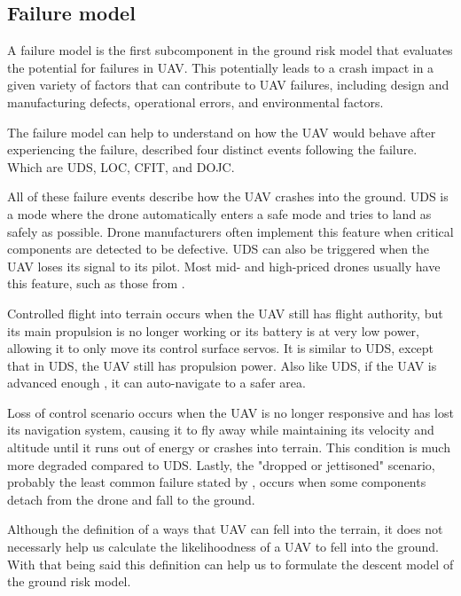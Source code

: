 \documentclass[12pt]{report}
\begin{document}
        \subsection{Failure model}
            A failure model is the first subcomponent in the ground risk model that evaluates the potential for failures
            in UAV. This potentially leads to a crash impact in a given variety of factors that can contribute to UAV
            failures, including design and manufacturing defects, operational errors, and environmental factors.

                The failure model can help to understand on how the UAV would behave after experiencing the failure,
            \cite{washington_review_2017} described four distinct events following the failure. Which are \ac{UDS}, 
            \ac{LOC}, \ac{CFIT}, and \ac{DOJC}.

            All of these failure events describe how the UAV crashes into the ground. UDS is a mode where the drone
            automatically enters a safe mode and tries to land as safely as possible. Drone manufacturers often
            implement this feature when critical components are detected to be defective. UDS can also be triggered when
            the UAV loses its signal to its pilot. Most mid- and high-priced drones usually have this feature, such as
            those from \cite{dji_consumer_2024}.
                
            Controlled flight into terrain occurs when the UAV still has flight authority, but its main propulsion is no
            longer working or its battery is at very low power, allowing it to only move its control surface servos. It
            is similar to UDS, except that in UDS, the UAV still has propulsion power. Also like UDS, if the UAV is
            advanced enough \cite{nemire_dji_2015}, it can auto-navigate to a safer area.
                
            Loss of control scenario occurs when the UAV is no longer responsive and has lost its navigation system,
            causing it to fly away while maintaining its velocity and altitude until it runs out of energy or crashes
            into terrain. This condition is much more degraded compared to UDS. Lastly, the "dropped or jettisoned"
            scenario, probably the least common failure stated by \cite{washington_review_2017}, occurs when some
            components detach from the drone and fall to the ground.

            Although the definition of a ways that UAV can fell into the terrain, it does not necessarly help us
            calculate the likelihoodness of a UAV to fell into the ground. With that being said this definition can help
            us to formulate the descent model of the ground risk model.
            
\end{document}
